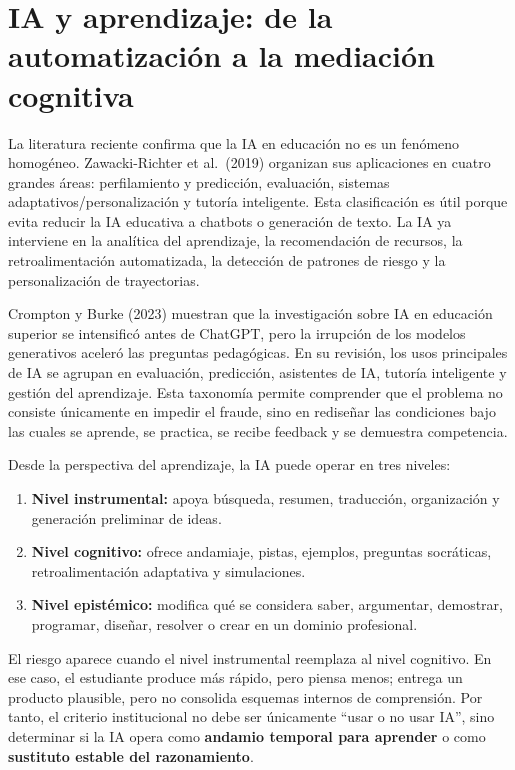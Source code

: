 \documentclass[
  spanish,
  letterpaper,
  DIV=11,
  numbers=noendperiod]{scrartcl}
\providecommand{\tightlist}{%
  \setlength{\itemsep}{0pt}\setlength{\parskip}{0pt}}
\begin{document}
\section{IA y aprendizaje: de la automatización a la mediación
cognitiva}\label{ia-y-aprendizaje-de-la-automatizaciuxf3n-a-la-mediaciuxf3n-cognitiva}

La literatura reciente confirma que la IA en educación no es un fenómeno
homogéneo. Zawacki-Richter et al.~(2019) organizan sus aplicaciones en
cuatro grandes áreas: perfilamiento y predicción, evaluación, sistemas
adaptativos/personalización y tutoría inteligente. Esta clasificación es
útil porque evita reducir la IA educativa a chatbots o generación de
texto. La IA ya interviene en la analítica del aprendizaje, la
recomendación de recursos, la retroalimentación automatizada, la
detección de patrones de riesgo y la personalización de trayectorias.

Crompton y Burke (2023) muestran que la investigación sobre IA en
educación superior se intensificó antes de ChatGPT, pero la irrupción de
los modelos generativos aceleró las preguntas pedagógicas. En su
revisión, los usos principales de IA se agrupan en evaluación,
predicción, asistentes de IA, tutoría inteligente y gestión del
aprendizaje. Esta taxonomía permite comprender que el problema no
consiste únicamente en impedir el fraude, sino en rediseñar las
condiciones bajo las cuales se aprende, se practica, se recibe feedback
y se demuestra competencia.

Desde la perspectiva del aprendizaje, la IA puede operar en tres
niveles:

\begin{enumerate}
\def\labelenumi{\arabic{enumi}.}
\tightlist
\item
  \textbf{Nivel instrumental:} apoya búsqueda, resumen, traducción,
  organización y generación preliminar de ideas.
\item
  \textbf{Nivel cognitivo:} ofrece andamiaje, pistas, ejemplos,
  preguntas socráticas, retroalimentación adaptativa y simulaciones.
\item
  \textbf{Nivel epistémico:} modifica qué se considera saber,
  argumentar, demostrar, programar, diseñar, resolver o crear en un
  dominio profesional.
\end{enumerate}

El riesgo aparece cuando el nivel instrumental reemplaza al nivel
cognitivo. En ese caso, el estudiante produce más rápido, pero piensa
menos; entrega un producto plausible, pero no consolida esquemas
internos de comprensión. Por tanto, el criterio institucional no debe
ser únicamente ``usar o no usar IA'', sino determinar si la IA opera
como \textbf{andamio temporal para aprender} o como \textbf{sustituto
estable del razonamiento}.
\end{document}
